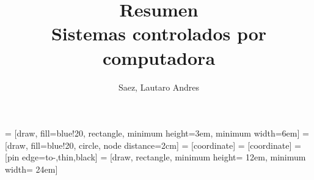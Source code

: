 \documentclass{book}
\title{Resumen \\ Sistemas controlados por computadora}
\author{Saez, Lautaro Andres}
\date{}
\begin{document}
    \maketitle
  

     = [draw, fill=blue!20, rectangle, 
    minimum height=3em, minimum width=6em]
     = [draw, fill=blue!20, circle, node distance=2cm]
     = [coordinate]
     = [coordinate]
     = [pin edge={to-,thin,black}]
     = [draw, rectangle, minimum height= 12em, minimum width= 24em]

    
     
    
    
    
    
\end{document}
